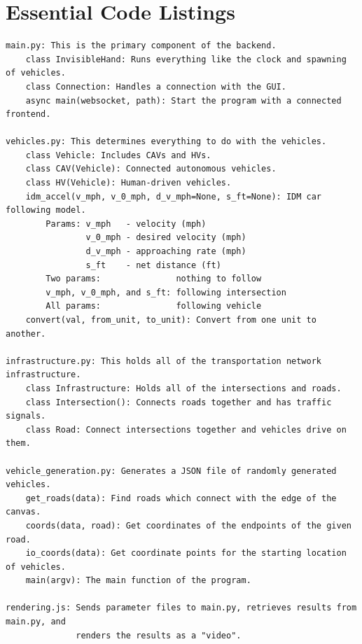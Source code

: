 \documentclass[onecolumn, draftclsnofoot,10pt, compsoc]{IEEEtran}
\begin{document}
\section{Essential Code Listings}
\begin{lstlisting}
main.py: This is the primary component of the backend.
    class InvisibleHand: Runs everything like the clock and spawning of vehicles.
    class Connection: Handles a connection with the GUI.
    async main(websocket, path): Start the program with a connected frontend.

vehicles.py: This determines everything to do with the vehicles.
    class Vehicle: Includes CAVs and HVs.
    class CAV(Vehicle): Connected autonomous vehicles.
    class HV(Vehicle): Human-driven vehicles.
    idm_accel(v_mph, v_0_mph, d_v_mph=None, s_ft=None): IDM car following model.
        Params: v_mph   - velocity (mph)
                v_0_mph - desired velocity (mph)
                d_v_mph - approaching rate (mph)
                s_ft    - net distance (ft)
        Two params:               nothing to follow
        v_mph, v_0_mph, and s_ft: following intersection
        All params:               following vehicle
    convert(val, from_unit, to_unit): Convert from one unit to another.

infrastructure.py: This holds all of the transportation network infrastructure.
    class Infrastructure: Holds all of the intersections and roads.
    class Intersection(): Connects roads together and has traffic signals.
    class Road: Connect intersections together and vehicles drive on them.

vehicle_generation.py: Generates a JSON file of randomly generated vehicles.
    get_roads(data): Find roads which connect with the edge of the canvas.
    coords(data, road): Get coordinates of the endpoints of the given road.
    io_coords(data): Get coordinate points for the starting location of vehicles.
    main(argv): The main function of the program.

rendering.js: Sends parameter files to main.py, retrieves results from main.py, and
              renders the results as a "video".
\end{lstlisting}


\end{document}
